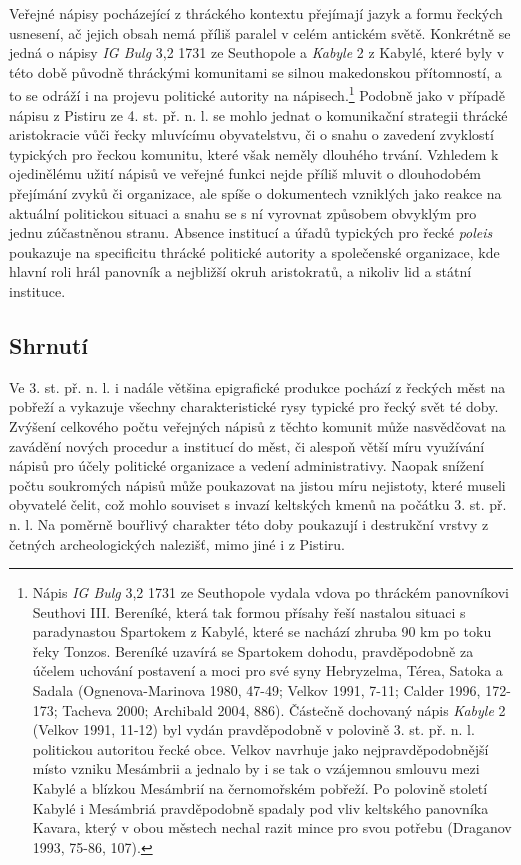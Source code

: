 Veřejné nápisy pocházející z thráckého kontextu přejímají jazyk a formu řeckých usnesení, ač jejich obsah nemá příliš paralel v celém antickém světě. Konkrétně se jedná o nápisy {\em IG Bulg} 3,2 1731 ze Seuthopole a {\em Kabyle} 2 z Kabylé, které byly v této době původně thráckými komunitami se silnou makedonskou přítomností, a to se odráží i na projevu politické autority na nápisech.\footnote{Nápis {\em IG Bulg} 3,2 1731 ze Seuthopole vydala vdova po thráckém panovníkovi Seuthovi III. Bereníké, která tak formou přísahy řeší nastalou situaci s paradynastou Spartokem z Kabylé, které se nachází zhruba 90 km po toku řeky Tonzos. Bereníké uzavírá se Spartokem dohodu, pravděpodobně za účelem uchování postavení a moci pro své syny Hebryzelma, Térea, Satoka a Sadala (Ognenova-Marinova 1980, 47-49; Velkov 1991, 7-11; Calder 1996, 172-173; Tacheva 2000; Archibald 2004, 886). Částečně dochovaný nápis {\em Kabyle} 2 (Velkov 1991, 11-12) byl vydán pravděpodobně v polovině 3. st. př. n. l. politickou autoritou řecké obce. Velkov navrhuje jako nejpravděpodobnější místo vzniku Mesámbrii a jednalo by i se tak o vzájemnou smlouvu mezi Kabylé a blízkou Mesámbrií na černomořském pobřeží. Po polovině století Kabylé i Mesámbriá pravděpodobně spadaly pod vliv keltského panovníka Kavara, který v obou městech nechal razit mince pro svou potřebu (Draganov 1993, 75-86, 107).} Podobně jako v případě nápisu z Pistiru ze 4. st. př. n. l. se mohlo jednat o komunikační strategii thrácké aristokracie vůči řecky mluvícímu obyvatelstvu, či o snahu o zavedení zvyklostí typických pro řeckou komunitu, které však neměly dlouhého trvání. Vzhledem k ojedinělému užití nápisů ve veřejné funkci nejde příliš mluvit o dlouhodobém přejímání zvyků či organizace, ale spíše o dokumentech vzniklých jako reakce na aktuální politickou situaci a snahu se s ní vyrovnat způsobem obvyklým pro jednu zúčastněnou stranu. Absence institucí a úřadů typických pro řecké {\em poleis} poukazuje na specificitu thrácké politické autority a společenské organizace, kde hlavní roli hrál panovník a nejbližší okruh aristokratů, a nikoliv lid a státní instituce.

\subsection[shrnutí-9]{Shrnutí}

Ve 3. st. př. n. l. i nadále většina epigrafické produkce pochází z řeckých měst na pobřeží a vykazuje všechny charakteristické rysy typické pro řecký svět té doby. Zvýšení celkového počtu veřejných nápisů z těchto komunit může nasvědčovat na zavádění nových procedur a institucí do měst, či alespoň větší míru využívání nápisů pro účely politické organizace a vedení administrativy. Naopak snížení počtu soukromých nápisů může poukazovat na jistou míru nejistoty, které museli obyvatelé čelit, což mohlo souviset s invazí keltských kmenů na počátku 3. st. př. n. l. Na poměrně bouřlivý charakter této doby poukazují i destrukční vrstvy z četných archeologických nalezišť, mimo jiné i z Pistiru.

